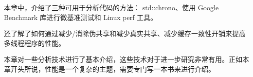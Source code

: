 本章中，介绍了三种可用于分析代码的方法： std::chrono、使用 Google Benchmark 库进行微基准测试和 Linux perf 工具。

还了解了如何通过减少/消除伪共享和减少真实共享、减少缓存一致性开销来提高多线程程序的性能。

本章对一些分析技术进行了基本介绍，这些技术对于进一步研究非常有用。正如本章开头所说，性能是一个复杂的主题，需要专门写一本书来进行介绍。